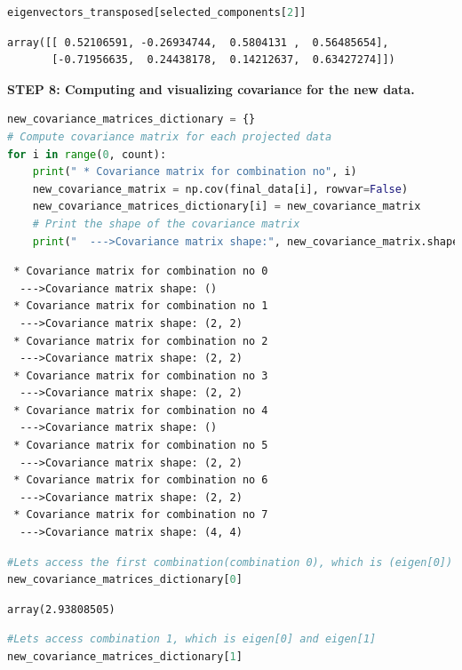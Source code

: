 \documentclass[
]{article}
\begin{document}
\begin{lstlisting}[language=Python]
eigenvectors_transposed[selected_components[2]]
\end{lstlisting}

\begin{lstlisting}
array([[ 0.52106591, -0.26934744,  0.5804131 ,  0.56485654],
       [-0.71956635,  0.24438178,  0.14212637,  0.63427274]])
\end{lstlisting}

\textbf{STEP 8: Computing and visualizing covariance for the new data.}

\begin{lstlisting}[language=Python]
new_covariance_matrices_dictionary = {}
# Compute covariance matrix for each projected data
for i in range(0, count):
    print(" * Covariance matrix for combination no", i)
    new_covariance_matrix = np.cov(final_data[i], rowvar=False)
    new_covariance_matrices_dictionary[i] = new_covariance_matrix
    # Print the shape of the covariance matrix
    print("  --->Covariance matrix shape:", new_covariance_matrix.shape)
\end{lstlisting}

\begin{lstlisting}
 * Covariance matrix for combination no 0
  --->Covariance matrix shape: ()
 * Covariance matrix for combination no 1
  --->Covariance matrix shape: (2, 2)
 * Covariance matrix for combination no 2
  --->Covariance matrix shape: (2, 2)
 * Covariance matrix for combination no 3
  --->Covariance matrix shape: (2, 2)
 * Covariance matrix for combination no 4
  --->Covariance matrix shape: ()
 * Covariance matrix for combination no 5
  --->Covariance matrix shape: (2, 2)
 * Covariance matrix for combination no 6
  --->Covariance matrix shape: (2, 2)
 * Covariance matrix for combination no 7
  --->Covariance matrix shape: (4, 4)
\end{lstlisting}

\begin{lstlisting}[language=Python]
#Lets access the first combination(combination 0), which is (eigen[0])                    (best component)
new_covariance_matrices_dictionary[0]
\end{lstlisting}

\begin{lstlisting}
array(2.93808505)
\end{lstlisting}

\begin{lstlisting}[language=Python]
#Lets access combination 1, which is eigen[0] and eigen[1]              (2 best components)
new_covariance_matrices_dictionary[1]
\end{lstlisting}
\end{document}

